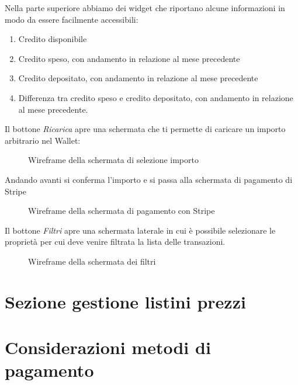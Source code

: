 Nella parte superiore abbiamo dei widget che riportano alcune informazioni in modo da essere facilmente accessibili:
\begin{enumerate}
  \item Credito disponibile
  \item Credito speso, con andamento in relazione al mese precedente
  \item Credito depositato, con andamento in relazione al mese precedente
  \item Differenza tra credito speso e credito depositato, con andamento in relazione al mese precedente.
\end{enumerate}

Il bottone \textit{Ricarica} apre una schermata che ti permette di caricare un importo arbitrario nel Wallet:

\begin{figure}[H]
  \centering
  \caption{Wireframe della schermata di selezione importo }
\end{figure}

Andando avanti si conferma l'importo e si passa alla schermata di pagamento di Stripe

\begin{figure}[H]
  \centering
  \caption{Wireframe della schermata di pagamento con Stripe }
\end{figure}

Il bottone \textit{Filtri} apre una schermata laterale in cui \`e possibile selezionare le propriet\`a per cui deve venire filtrata la lista delle transazioni.

\begin{figure}[H]
  \centering
  \caption{Wireframe della schermata dei filtri}
\end{figure}

\section{Sezione gestione listini prezzi}

\section{Considerazioni metodi di pagamento}
